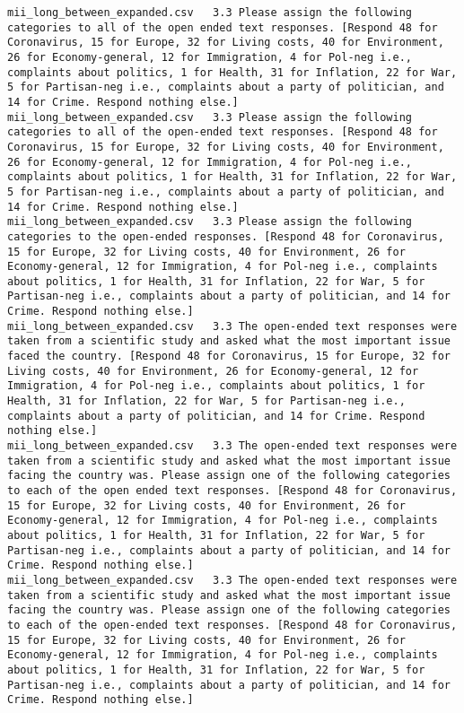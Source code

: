 \begin{lstlisting}[label=lst:promptvariants]
mii_long_between_expanded.csv	3.3	Please assign the following categories to all of the open ended text responses. [Respond 48 for Coronavirus, 15 for Europe, 32 for Living costs, 40 for Environment, 26 for Economy-general, 12 for Immigration, 4 for Pol-neg i.e., complaints about politics, 1 for Health, 31 for Inflation, 22 for War, 5 for Partisan-neg i.e., complaints about a party of politician, and 14 for Crime. Respond nothing else.]
mii_long_between_expanded.csv	3.3	Please assign the following categories to all of the open-ended text responses. [Respond 48 for Coronavirus, 15 for Europe, 32 for Living costs, 40 for Environment, 26 for Economy-general, 12 for Immigration, 4 for Pol-neg i.e., complaints about politics, 1 for Health, 31 for Inflation, 22 for War, 5 for Partisan-neg i.e., complaints about a party of politician, and 14 for Crime. Respond nothing else.]
mii_long_between_expanded.csv	3.3	Please assign the following categories to the open-ended responses. [Respond 48 for Coronavirus, 15 for Europe, 32 for Living costs, 40 for Environment, 26 for Economy-general, 12 for Immigration, 4 for Pol-neg i.e., complaints about politics, 1 for Health, 31 for Inflation, 22 for War, 5 for Partisan-neg i.e., complaints about a party of politician, and 14 for Crime. Respond nothing else.]
mii_long_between_expanded.csv	3.3	The open-ended text responses were taken from a scientific study and asked what the most important issue faced the country. [Respond 48 for Coronavirus, 15 for Europe, 32 for Living costs, 40 for Environment, 26 for Economy-general, 12 for Immigration, 4 for Pol-neg i.e., complaints about politics, 1 for Health, 31 for Inflation, 22 for War, 5 for Partisan-neg i.e., complaints about a party of politician, and 14 for Crime. Respond nothing else.]
mii_long_between_expanded.csv	3.3	The open-ended text responses were taken from a scientific study and asked what the most important issue facing the country was. Please assign one of the following categories to each of the open ended text responses. [Respond 48 for Coronavirus, 15 for Europe, 32 for Living costs, 40 for Environment, 26 for Economy-general, 12 for Immigration, 4 for Pol-neg i.e., complaints about politics, 1 for Health, 31 for Inflation, 22 for War, 5 for Partisan-neg i.e., complaints about a party of politician, and 14 for Crime. Respond nothing else.]
mii_long_between_expanded.csv	3.3	The open-ended text responses were taken from a scientific study and asked what the most important issue facing the country was. Please assign one of the following categories to each of the open-ended text responses. [Respond 48 for Coronavirus, 15 for Europe, 32 for Living costs, 40 for Environment, 26 for Economy-general, 12 for Immigration, 4 for Pol-neg i.e., complaints about politics, 1 for Health, 31 for Inflation, 22 for War, 5 for Partisan-neg i.e., complaints about a party of politician, and 14 for Crime. Respond nothing else.]

\end{lstlisting}
